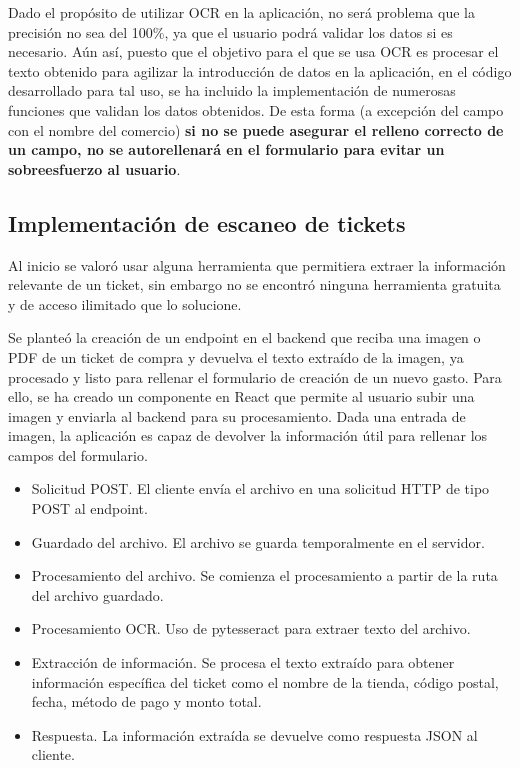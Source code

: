Dado el propósito de utilizar OCR en la aplicación, no será problema que la precisión no sea del 100\%, ya que el usuario podrá validar los datos si es necesario. Aún así, puesto que el objetivo para el que se usa OCR es procesar el texto obtenido para agilizar la introducción de datos en la aplicación, en el código desarrollado para tal uso, se ha incluido la implementación de numerosas funciones que validan los datos obtenidos. De esta forma (a excepción del campo con el nombre del comercio) \textbf{si no se puede asegurar el relleno correcto de un campo, no se autorellenará en el formulario para evitar un sobreesfuerzo al usuario}.


\subsection{Implementación de escaneo de tickets}
Al inicio se valoró usar alguna herramienta que permitiera extraer la información relevante de un ticket, sin embargo no se encontró ninguna herramienta gratuita y de acceso ilimitado que lo solucione. 

Se planteó la creación de un endpoint en el backend que reciba una imagen o PDF de un ticket de compra y devuelva el texto extraído de la imagen, ya procesado y listo para rellenar el formulario de creación de un nuevo gasto. Para ello, se ha creado un componente en React que permite al usuario subir una imagen y enviarla al backend para su procesamiento. Dada una entrada de imagen, la aplicación es capaz de devolver la información útil para rellenar los campos del formulario.

\begin{itemize}
    \item Solicitud POST. El cliente envía el archivo en una solicitud HTTP de tipo POST al endpoint.
    \item Guardado del archivo. El archivo se guarda temporalmente en el servidor.
    \item Procesamiento del archivo. Se comienza el procesamiento a partir de la ruta del archivo guardado.
    \item Procesamiento OCR. Uso de pytesseract para extraer texto del archivo.
    \item Extracción de información. Se procesa el texto extraído para obtener información específica del ticket como el nombre de la tienda, código postal, fecha, método de pago y monto total.
    \item Respuesta. La información extraída se devuelve como respuesta JSON al cliente.
\end{itemize}

